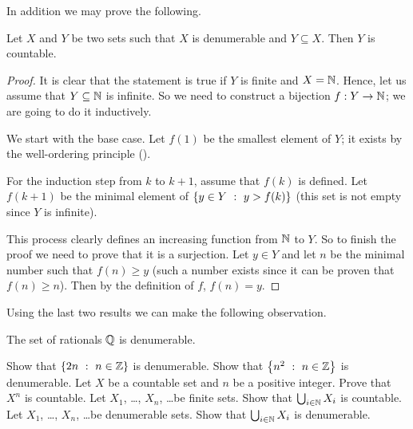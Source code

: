 In addition we may prove the following.
\begin{theorem}
  Let $X$ and $Y$ be two sets such that $X$ is denumerable and $Y \subseteq X$.
  Then $Y$ is countable.
\end{theorem}
\begin{proof}
  It is clear that the statement is true if $Y$ is finite and $X = {\mathbb{N}}$. 
  Hence, let us assume that $Y \subseteq {\mathbb{N}}$ is infinite. So we need to
  construct a bijection $f : Y \to {\mathbb{N}}$; we are going to do it inductively.

  We start with the base case.
  Let $f(1)$ be the smallest element of $Y$; it exists by the well-ordering
  principle (). 

  For the induction step from $k$ to $k + 1$, assume that $f(k)$ is defined.
  Let $f(k + 1)$ be the minimal element of $\set[y > f(k)]{y \in Y}$ (this set
  is not empty since $Y$ is infinite).

  This process clearly defines an increasing function from ${\mathbb{N}}$ to $Y$. So to
  finish the proof we need to prove that it is a surjection.
  Let $y \in Y$ and let $n$ be the minimal number such that $f(n) \ge y$ (such a
  number exists since it can be proven that $f(n) \ge n$). Then by the
  definition of $f$, $f(n) = y$.
\end{proof}

Using the last two results we can make the following observation.
\begin{theorem}
  The set of rationals ${\mathbb{Q}}$ is denumerable.
\end{theorem}

\begin{chapterendexercises}
    \exercise[recommended] Show that $\set[n \in \Z]{2n}$ is denumerable.
    \exercise Show that $\set[n \in \Z]{n^2}$ is denumerable.
    \exercise Let $X$ be a countable set and $n$ be a positive integer. Prove
      that $X^n$ is countable.
    \exercise[recommended] Let $X_1$, \dots, $X_n$, \dots be finite sets. Show that
      $\bigcup_{i \in {\mathbb{N}}} X_i$ is countable.
    \exercise Let $X_1$, \dots, $X_n$, \dots be denumerable sets. Show that
      $\bigcup_{i \in {\mathbb{N}}} X_i$ is denumerable.
\end{chapterendexercises}
